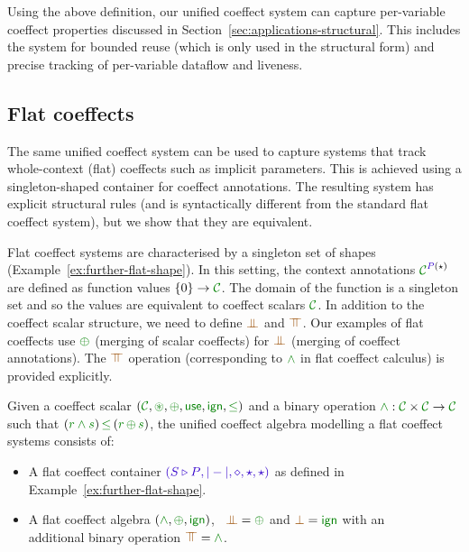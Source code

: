 \noindent
Using the above definition, our unified coeffect system can capture per-variable coeffect properties
discussed in Section~\ref{sec:applications-structural}. This includes the system for bounded reuse
(which is only used in the structural form) and precise tracking of per-variable dataflow and liveness.


\subsection{Flat coeffects}
\label{sec:further-flat}

The same unified coeffect system can be used to capture systems that track whole-context (flat)
coeffects such as implicit parameters. This is achieved using a singleton-shaped container for
coeffect annotations. The resulting system has explicit structural rules (and is syntactically
different from the standard flat coeffect system), but we show that they are equivalent.

Flat coeffect systems are characterised by a singleton set of shapes (Example~\ref{ex:further-flat-shape}).
In this setting, the context annotations $\C^{ \SP(\sflat) }$ are defined as function values
$\{0\} \rightarrow \C$. The domain of the function is a singleton set and so the values are equivalent
to coeffect scalars $\C$. In addition to the coeffect scalar structure, we need to define $\apar$
and $\azip$. Our examples of flat coeffects use $\cpar$ (merging of scalar coeffects) for $\apar$
(merging of coeffect annotations). The $\azip$ operation (corresponding to $\czip$
in flat coeffect calculus) is provided explicitly.

\begin{definition}
\label{def:further-flat}
Given a coeffect scalar $(\C, \cseq, \cpar, \cunit, \czero, \cleq)$ and a binary operation
$\cclrd{\wedge} : \C \times \C \rightarrow \C$ such that $(\cclrd{r \wedge s}) \,\cleq\, (\cclrd{r}\,\cpar\,\cclrd{s})$,
the unified coeffect algebra modelling a flat coeffect systems consists of:
%
\begin{itemize}{}
\item A flat coeffect container $\sclrd{(\SHP, {|}-{|}, \diamond, \sflat, \sflat)}$ as defined in
  Example~\ref{ex:further-flat-shape}.

\item A flat coeffect algebra $(\czip, \cpar, \czero)$, \ie~$\apar = \cpar$
  and $\azero = \czero$ with an\\ additional binary operation $\azip = \czip$.
\end{itemize}
\end{definition}

